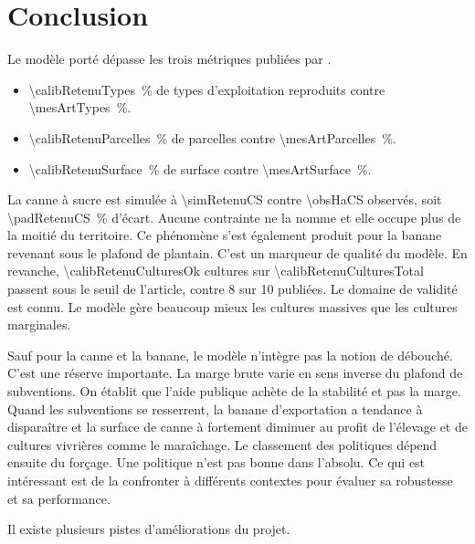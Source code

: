 \chapter*{Conclusion}

Le modèle porté dépasse les trois métriques publiées par \textcite{chopin2015}.

\begin{itemize}[leftmargin=1.2em,itemsep=3pt]
  \item \SI{\calibRetenuTypes}{\percent} de types d'exploitation reproduits contre
    \SI{\mesArtTypes}{\percent}.
  \item \SI{\calibRetenuParcelles}{\percent} de parcelles contre \SI{\mesArtParcelles}{\percent}.
  \item \SI{\calibRetenuSurface}{\percent} de surface contre \SI{\mesArtSurface}{\percent}.
\end{itemize}

La canne à sucre est simulée à \SI{\simRetenuCS}{\ha} contre \SI{\obsHaCS}{\ha} observés,
soit \SI{\padRetenuCS}{\percent} d'écart. Aucune contrainte ne la nomme et elle occupe plus de
la moitié du territoire. Ce phénomène s'est également produit pour la banane revenant sous le
plafond de plantain. C'est un marqueur de qualité du modèle.
En revanche, \num{\calibRetenuCulturesOk} cultures sur \num{\calibRetenuCulturesTotal}
passent sous le seuil de l'article, contre \num{8} sur \num{10} publiées.
Le domaine de validité est connu. Le modèle gère beaucoup mieux les cultures massives que les
cultures marginales.

Sauf pour la canne et la banane, le modèle n'intègre pas la notion de débouché. C'est une
réserve importante.
La marge brute varie en sens inverse du plafond de subventions. On établit que l'aide publique
achète de la stabilité et pas la marge. Quand les subventions se resserrent, la banane
d'exportation a tendance à disparaître et la surface de canne à fortement diminuer au profit de
l'élevage et de cultures vivrières comme le maraîchage.
Le classement des politiques dépend ensuite du forçage. Une politique n'est pas bonne
dans l'absolu. Ce qui est intéressant est de la confronter à différents contextes pour évaluer
sa robustesse et sa performance.

Il existe plusieurs pistes d'améliorations du projet.

